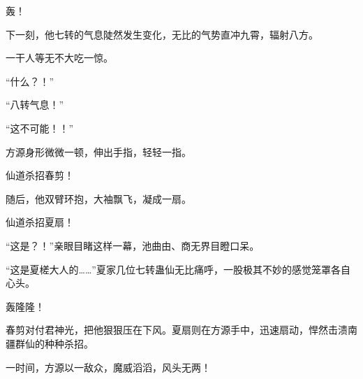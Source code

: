 \begin{this_body}
轰！

下一刻，他七转的气息陡然发生变化，无比的气势直冲九霄，辐射八方。

一干人等无不大吃一惊。

“什么？！”

“八转气息！”

“这不可能！！”

方源身形微微一顿，伸出手指，轻轻一指。

仙道杀招春剪！

随后，他双臂环抱，大袖飘飞，凝成一扇。

仙道杀招夏扇！

“这是？！”亲眼目睹这样一幕，池曲由、商无界目瞪口呆。

“这是夏槎大人的……”夏家几位七转蛊仙无比痛呼，一股极其不妙的感觉笼罩各自心头。

轰隆隆！

春剪对付君神光，把他狠狠压在下风。夏扇则在方源手中，迅速扇动，悍然击溃南疆群仙的种种杀招。

一时间，方源以一敌众，魔威滔滔，风头无两！

\end{this_body}

